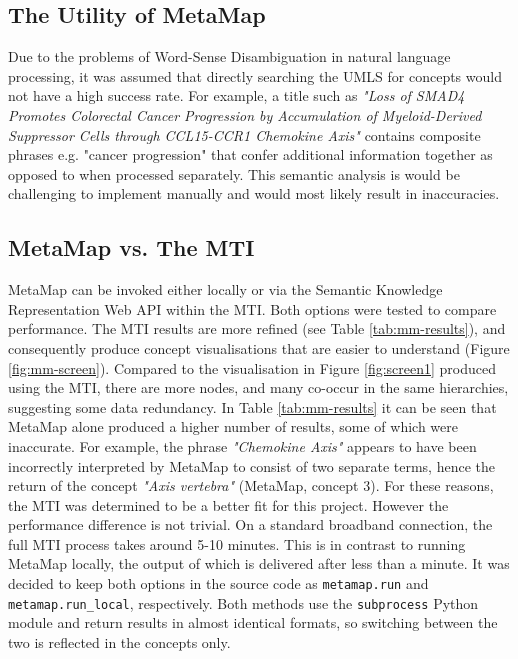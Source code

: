 \documentclass[Report.tex]{subfiles}
\begin{document}
\subsection{The Utility of MetaMap}
Due to the problems of Word-Sense Disambiguation in natural language processing, it was assumed that directly searching the UMLS for concepts would not have a high success rate. For example, a title such as \emph{"Loss of SMAD4 Promotes Colorectal Cancer Progression by Accumulation of Myeloid-Derived Suppressor Cells through CCL15-CCR1 Chemokine Axis"} contains composite phrases e.g. "cancer progression" that confer additional information together as opposed to when processed separately. This semantic analysis is would be challenging to implement manually and would most likely result in inaccuracies.

\subsection{MetaMap vs. The MTI}
\noindent MetaMap can be invoked either locally or via the Semantic Knowledge Representation Web API within the MTI. Both options were tested to compare performance. The MTI results are more refined (see Table \ref{tab:mm-results}), and consequently produce concept visualisations that are easier to understand (Figure \ref{fig:mm-screen}). Compared to the visualisation in Figure \ref{fig:screen1} produced using the MTI, there are more nodes, and many co-occur in the same hierarchies, suggesting some data redundancy. In Table \ref{tab:mm-results} it can be seen that MetaMap alone produced a higher number of results, some of which were inaccurate. For example, the phrase \emph{"Chemokine Axis"} appears to have been incorrectly interpreted by MetaMap to consist of two separate terms, hence the return of the concept \emph{"Axis vertebra"} (MetaMap, concept 3). For these reasons, the MTI was determined to be a better fit for this project. However the performance difference is not trivial. On a standard broadband connection, the full MTI process takes around 5-10 minutes. This is in contrast to running MetaMap locally, the output of which is delivered after less than a minute. It was decided to keep both options in the source code as \texttt{metamap.run} and \texttt{metamap.run\_local}, respectively. Both methods use the \texttt{subprocess} Python module and return results in almost identical formats, so switching between the two is reflected in the concepts only.\newline
\end{document}
